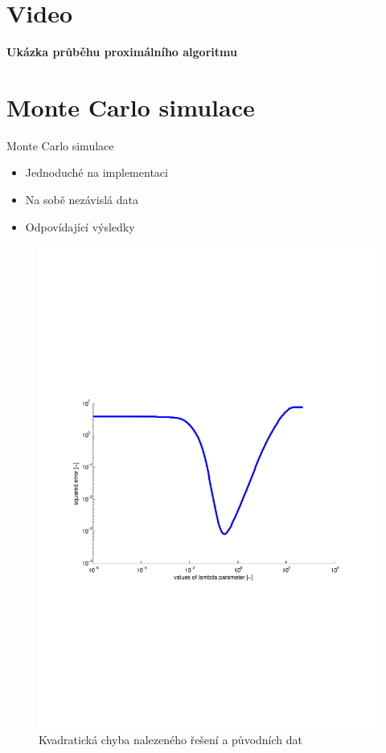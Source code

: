 \section{Video}
\begin{frame}
	\vfill
	\begin{center}
		{\Large \bfseries
			Ukázka průběhu proximálního algoritmu
		} 
	\end{center}
\end{frame}
\section{Monte Carlo simulace}
\begin{frame}
	\vfill
	\begin{block}{Monte Carlo simulace}
		\begin{itemize}
			\item Jednoduché na implementaci
			\item Na sobě nezávislá data
			\item Odpovídající výsledky
		\end{itemize}
	\end{block}
\end{frame}
\begin{frame}
	\vfill
	\begin{figure}[!ht]
		\begin{center}
			\includegraphics[scale=0.6]{obr/nse.pdf}
		\end{center}
		\caption{Kvadratická chyba nalezeného řešení a původních dat}
		\label{fig:nse}
	\end{figure}
\end{frame}
